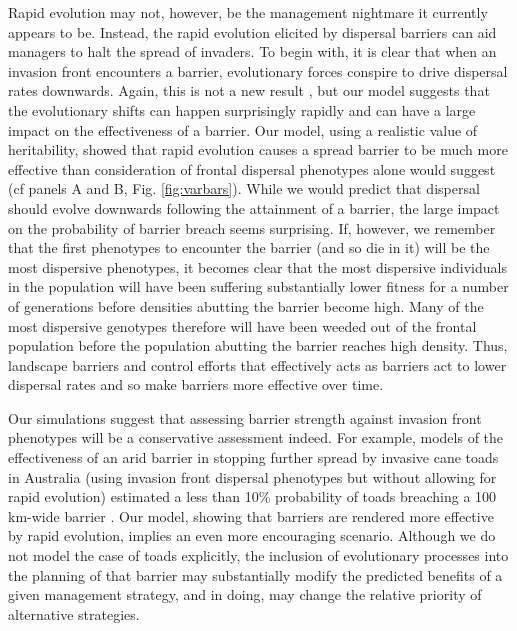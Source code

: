 \documentclass{article}
\begin{document}
Rapid evolution may not, however, be the management nightmare it currently appears to be.  Instead, the rapid evolution elicited by dispersal barriers can aid managers to halt the spread of invaders.  To begin with, it is clear that when an invasion front encounters a barrier, evolutionary forces conspire to drive dispersal rates downwards.  Again, this is not a new result \cite[e.g.,][]{Kubisch_Hovestadt_Poethke_2010, Phillips_2012}, but our model suggests that the evolutionary shifts can happen surprisingly rapidly and can have a large impact on the effectiveness of a barrier.  Our model, using a realistic value of heritability, showed that rapid evolution causes a spread barrier to be much more effective than consideration of frontal dispersal phenotypes alone would suggest (cf panels A and B, Fig. \ref{fig:varbars}).  While we would predict that dispersal should evolve downwards following the attainment of a barrier, the large impact on the probability of barrier breach seems surprising.  If, however, we remember that the first phenotypes to encounter the barrier (and so die in it) will be the most dispersive phenotypes, it becomes clear that the most dispersive individuals in the population will have been suffering substantially lower fitness for a number of generations before densities abutting the barrier become high.  Many of the most dispersive genotypes therefore will have been weeded out of the frontal population before the population abutting the barrier reaches high density.  Thus, landscape barriers and control efforts that effectively acts as barriers \citep[such as efforts to contain the spread of Gypsy Moth:][]{Sharov_1998} act to lower dispersal rates and so make barriers more effective over time.

Our simulations suggest that assessing barrier strength against invasion front phenotypes will be a conservative assessment indeed.  For example, models of the effectiveness of an arid barrier in stopping further spread by invasive cane toads in Australia (using invasion front dispersal phenotypes but without allowing for rapid evolution) estimated a less than 10\% probability of toads breaching a 100 km-wide barrier \citep[Fig. 6 in][]{Tingley_Phillips_Letnic_Brown_Shine_Baird_2013}. Our model, showing that barriers are rendered more effective by rapid evolution, implies an even more encouraging scenario. Although we do not model the case of toads explicitly, the inclusion of evolutionary processes into the planning of that barrier may substantially modify the predicted benefits of a given management strategy, and in doing, may change the relative priority of alternative strategies. 
\end{document}
